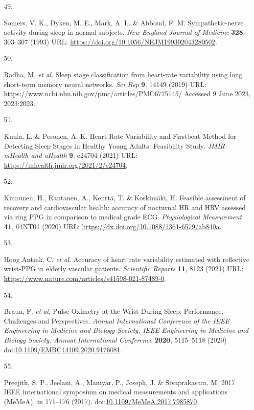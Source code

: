 \documentclass[
  9pt,
]{scrbook}
\newlength{\cslhangindent}
\newlength{\csllabelwidth}
\newlength{\cslentryspacingunit} %
\newenvironment{CSLReferences}[2] %
 {%
  \setlength{\parindent}{0pt}
  \ifodd #1
  \let\oldpar\par
  \def\par{\hangindent=\cslhangindent\oldpar}
  \fi
  \setlength{\parskip}{#2\cslentryspacingunit}
 }%
 {}
\newcommand{\CSLLeftMargin}[1]{\parbox[t]{\csllabelwidth}{#1}}
\newcommand{\CSLRightInline}[1]{\parbox[t]{\linewidth - \csllabelwidth}{#1}\break}
\begin{document}
\begin{CSLReferences}{0}{0}
\leavevmode{}%
\CSLLeftMargin{49. }%
\CSLRightInline{Somers, V. K., Dyken, M. E., Mark, A. L. \& Abboud, F.
M. Sympathetic-nerve activity during sleep in normal subjects. \emph{New
England Journal of Medicine} \textbf{328}, 303--307 (1993) URL:
\url{https://doi.org/10.1056/NEJM199302043280502}.}

\leavevmode{}%
\CSLLeftMargin{50. }%
\CSLRightInline{Radha, M. \emph{et al.} Sleep stage classification from
heart-rate variability using long short-term memory neural networks.
\emph{Sci Rep} \textbf{9}, 14149 (2019) URL:
\url{https://www.ncbi.nlm.nih.gov/pmc/articles/PMC6775145/} Accessed 9
June 2023, 2023:2023.}

\leavevmode{}%
\CSLLeftMargin{51. }%
\CSLRightInline{Kuula, L. \& Pesonen, A.-K. Heart Rate Variability and
Firstbeat Method for Detecting Sleep Stages in Healthy Young Adults:
Feasibility Study. \emph{JMIR mHealth and uHealth} \textbf{9}, e24704
(2021) URL: \url{https://mhealth.jmir.org/2021/2/e24704}.}

\leavevmode{}%
\CSLLeftMargin{52. }%
\CSLRightInline{Kinnunen, H., Rantanen, A., Kenttä, T. \& Koskimäki, H.
Feasible assessment of recovery and cardiovascular health: accuracy of
nocturnal HR and HRV assessed via ring PPG in comparison to medical
grade ECG. \emph{Physiological Measurement} \textbf{41}, 04NT01 (2020)
URL: \url{https://dx.doi.org/10.1088/1361-6579/ab840a}.}

\leavevmode{}%
\CSLLeftMargin{53. }%
\CSLRightInline{Hoog Antink, C. \emph{et al.} Accuracy of heart rate
variability estimated with reflective wrist-PPG in elderly vascular
patients. \emph{Scientific Reports} \textbf{11}, 8123 (2021) URL:
\url{https://www.nature.com/articles/s41598-021-87489-0}.}

\leavevmode{}%
\CSLLeftMargin{54. }%
\CSLRightInline{Braun, F. \emph{et al.} Pulse Oximetry at the Wrist
During Sleep: Performance, Challenges and Perspectives. \emph{Annual
International Conference of the IEEE Engineering in Medicine and Biology
Society. IEEE Engineering in Medicine and Biology Society. Annual
International Conference} \textbf{2020}, 5115--5118 (2020)
doi:\href{https://doi.org/10.1109/EMBC44109.2020.9176081}{10.1109/EMBC44109.2020.9176081}.}

\leavevmode{}%
\CSLLeftMargin{55. }%
\CSLRightInline{Preejith, S. P., Jeelani, A., Maniyar, P., Joseph, J. \&
Sivaprakasam, M. 2017 IEEE international symposium on medical
measurements and applications (MeMeA). in 171--176 (2017).
doi:\href{https://doi.org/10.1109/MeMeA.2017.7985870}{10.1109/MeMeA.2017.7985870}.}


\end{CSLReferences}
\end{document}
